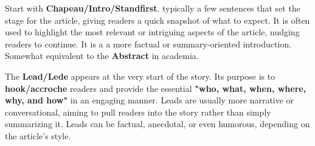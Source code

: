 
Start with \textcolor{myColorSuccess}{\textbf{Chapeau/Intro/Standfirst}}. typically a few sentences that set the stage for the article, giving readers a quick snapshot of what to expect. It is often used to highlight the most relevant or intriguing aspects of the article, nudging readers to continue. It is a  a more factual or summary-oriented introduction. Somewhat equivalent to the \textcolor{myColorSuccess}{\textbf{Abstract}} in academia.


The \textcolor{myColorSuccess}{\textbf{Lead/Lede}} appears at the very start of the story. Its purpose is to \textcolor{myColorSuccess}{\textbf{hook/accroche}} readers and provide the essential \textbf{"who, what, when, where, why, and how"} in an engaging manner. Leads are usually more narrative or conversational, aiming to pull readers into the story rather than simply summarizing it. Leads can be factual, anecdotal, or even humorous, depending on the article's style.


\lipsum[1]

\lipsum[2]

\lipsum[3]

